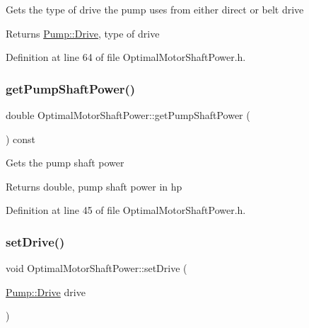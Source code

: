 Gets the type of drive the pump uses from either direct or belt drive

\begin{DoxyReturn}{Returns}
\hyperlink{class_pump_a32bf0ade131a11bb3b3fb374f638e983}{Pump\+::\+Drive}, type of drive 
\end{DoxyReturn}


Definition at line 64 of file Optimal\+Motor\+Shaft\+Power.\+h.

\mbox{\label{class_optimal_motor_shaft_power_aca7bb632c659ecf2ebf3cb9fdb23626f}} 
\subsubsection{\texorpdfstring{get\+Pump\+Shaft\+Power()}{getPumpShaftPower()}}
{\footnotesize\ttfamily double Optimal\+Motor\+Shaft\+Power\+::get\+Pump\+Shaft\+Power (\begin{DoxyParamCaption}{ }\end{DoxyParamCaption}) const\hspace{0.3cm}{\ttfamily [inline]}}

Gets the pump shaft power

\begin{DoxyReturn}{Returns}
double, pump shaft power in hp 
\end{DoxyReturn}


Definition at line 45 of file Optimal\+Motor\+Shaft\+Power.\+h.

\mbox{\label{class_optimal_motor_shaft_power_abd88cbdcba70dbb194a8f957b4467fc7}} 
\subsubsection{\texorpdfstring{set\+Drive()}{setDrive()}}
{\footnotesize\ttfamily void Optimal\+Motor\+Shaft\+Power\+::set\+Drive (\begin{DoxyParamCaption}\item[{\hyperlink{class_pump_a32bf0ade131a11bb3b3fb374f638e983}{Pump\+::\+Drive}}]{drive }\end{DoxyParamCaption})\hspace{0.3cm}{\ttfamily [inline]}}

